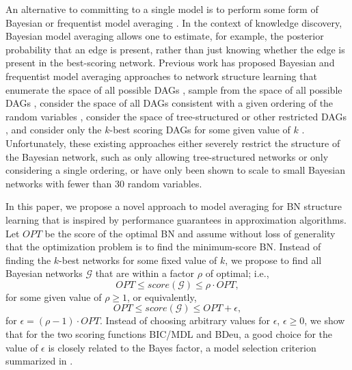 \documentclass[letterpaper]{article}
\newcommand{\opt}{\mathit{OPT}}
\newcommand{\cost}{\mathit{score}}
\begin{document}
An alternative to committing to a single model is to
perform some form of Bayesian or frequentist model averaging 
\cite{Claeskens2008,HoetingMRV1999,KollerF09}.
In the context of knowledge discovery, Bayesian model averaging
allows one to estimate, for example, the posterior probability
that an edge is present, rather than just knowing whether the
edge is present in the best-scoring network.
Previous work has proposed
Bayesian and frequentist model averaging approaches to network structure
learning that enumerate the space of all possible DAGs \cite{KoivistoS04}, sample from the space of all
possible DAGs \cite{HeTW2016,MadiganR1994}, consider
the space of all DAGs consistent with a given ordering of
the random variables \cite{Buntine91,DashC2004},
consider the space of tree-structured or other restricted
DAGs \cite{MadiganR1994,Meila2000}, and consider
only the $k$-best scoring DAGs for some given value of $k$
\cite{ChenCD2015,ChenCD2016,chen2018pruning,ChenT2014,HeTW2016,TianHR10}.
Unfortunately, these existing approaches either severely
restrict the structure of the Bayesian network, such as
only allowing tree-structured networks or only considering a
single ordering, or have only been shown to scale to small
Bayesian networks with fewer than 30 random variables.

In this paper, we propose a novel approach to
model averaging for BN structure learning that is inspired
by performance guarantees in approximation algorithms. Let
$\opt$ be the score of the optimal BN and assume 
without loss of generality that the optimization problem
is to find the minimum-score BN.
Instead of
finding the $k$-best networks for some fixed value of $k$,
we propose to find all Bayesian networks $\mathcal{G}$ that
are within a factor $\rho$ of optimal; i.e.,
\begin{equation}
\label{EQUATION:factor}
\opt \le \cost(\mathcal{G}) \le \rho \cdot \opt,
\end{equation}
for some given value of $\rho \ge 1$, or equivalently,
\begin{equation}
\label{EQUATION:factor_add}
\opt \le \cost(\mathcal{G}) \le \opt+\epsilon,
\end{equation}
for $\epsilon = (\rho - 1) \cdot \opt$. Instead of choosing arbitrary 
values for $\epsilon$, $\epsilon \ge 0$, we show that for the 
two scoring functions BIC/MDL and BDeu, a good choice for the value of $\epsilon$ is 
closely related to the Bayes factor, a model selection criterion 
summarized in \cite{kass1995bayes}.
\end{document}
